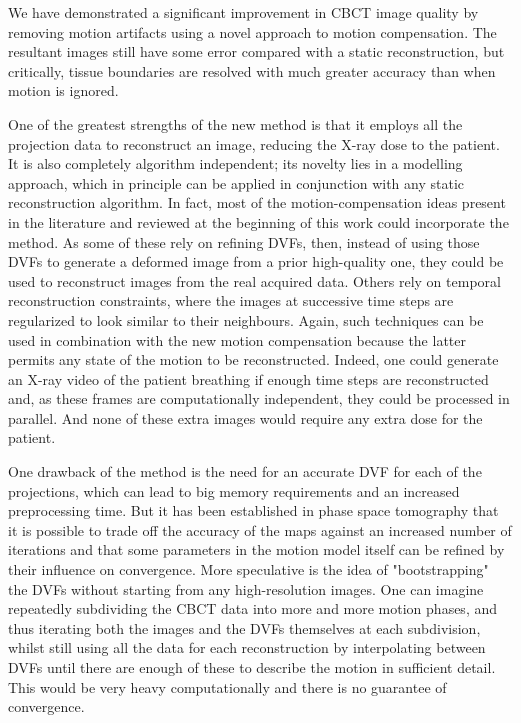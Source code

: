 We have demonstrated a significant improvement in CBCT image quality by removing motion artifacts using a novel approach to motion compensation.  The resultant images still have some error compared with a static reconstruction, but critically, tissue boundaries are resolved with much greater accuracy than when motion is ignored. 

One of the greatest strengths of the new method is that it employs all the projection data to reconstruct an image, reducing the X-ray dose to the patient.  It is also completely algorithm independent; its novelty lies in a modelling approach, which in principle can be applied in conjunction with any static reconstruction algorithm.  In fact, most of the motion-compensation ideas present in the literature and reviewed at the beginning of this work could incorporate the method.  As some of these rely on refining DVFs, then, instead of using those DVFs to generate a deformed image from a prior high-quality one, they could be used to reconstruct images from the real acquired data.  Others rely on temporal reconstruction constraints, where the images at successive time steps are regularized to look similar to their neighbours.  Again, such techniques can be used in combination with the new motion compensation because the latter permits any state of the motion to be reconstructed.  Indeed, one could generate an X-ray video of the patient breathing if enough time steps are reconstructed and, as these frames are computationally independent, they could be processed in parallel.  And none of these extra images would require any extra dose for the patient.

One drawback of the method is the need for an accurate DVF for each of the projections, which can lead to big memory requirements and an increased preprocessing time.  But it has been established in phase space tomography that it is possible to trade off the accuracy of the maps against an increased number of iterations and that some parameters in the motion model itself can be refined by their influence on convergence\cite{pst1}\cite{pst2}.  More speculative is the idea of "bootstrapping" the DVFs without starting from any high-resolution images.  One can imagine repeatedly subdividing the CBCT data into more and more motion phases, and thus iterating both the images and the DVFs themselves at each subdivision, whilst still using all the data for each reconstruction by interpolating between DVFs until there are enough of these to describe the motion in sufficient detail.  This would be very heavy computationally and there is no guarantee of convergence.

